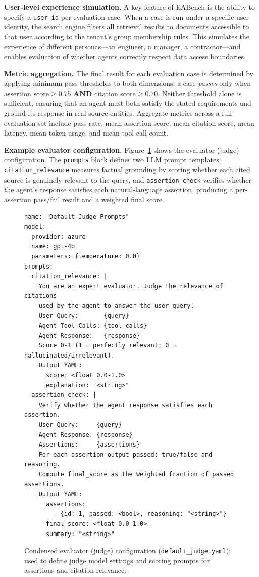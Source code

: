 \documentclass[journal,dvipsnames]{acmart}
\begin{document}
\textbf{User-level experience simulation.}
A key feature of EABench is the ability to specify a \texttt{user\_id} per
evaluation case.  When a case is run under a specific user identity, the search
engine filters all retrieval results to documents accessible to that user
according to the tenant's group membership rules.  This simulates the
experience of different personas---an engineer, a manager, a contractor---and
enables evaluation of whether agents correctly respect data access boundaries.

\textbf{Metric aggregation.}
The final result for each evaluation case is determined by applying minimum
pass thresholds to both dimensions: a case \emph{passes} only when
$\text{assertion\_score} \geq 0.75$ \textbf{AND}
$\text{citation\_score} \geq 0.70$.
Neither threshold alone is sufficient, ensuring that an agent must both satisfy
the stated requirements and ground its response in real source entities.
Aggregate metrics across a full evaluation set include pass rate, mean
assertion score, mean citation score, mean latency, mean token usage, and mean
tool call count.

\textbf{Example evaluator configuration.}
Figure~\ref{lst:judge_config} shows the evaluator (judge) configuration.
The \texttt{prompts} block defines two LLM prompt templates:
\texttt{citation\_relevance} measures factual grounding by scoring whether
each cited source is genuinely relevant to the query, and
\texttt{assertion\_check} verifies whether the agent's response satisfies
each natural-language assertion, producing a per-assertion pass/fail result
and a weighted final score.

\begin{figure}[h]
  \centering
  
\begin{minipage}{0.9\textwidth}
\begin{lstlisting}
name: "Default Judge Prompts"
model:
  provider: azure
  name: gpt-4o
  parameters: {temperature: 0.0}
prompts:
  citation_relevance: |
    You are an expert evaluator. Judge the relevance of citations
    used by the agent to answer the user query.
    User Query:       {query}
    Agent Tool Calls: {tool_calls}
    Agent Response:   {response}
    Score 0-1 (1 = perfectly relevant; 0 = hallucinated/irrelevant).
    Output YAML:
      score: <float 0.0-1.0>
      explanation: "<string>"
  assertion_check: |
    Verify whether the agent response satisfies each assertion.
    User Query:     {query}
    Agent Response: {response}
    Assertions:     {assertions}
    For each assertion output passed: true/false and reasoning.
    Compute final_score as the weighted fraction of passed assertions.
    Output YAML:
      assertions:
        - {id: 1, passed: <bool>, reasoning: "<string>"}
      final_score: <float 0.0-1.0>
      summary: "<string>"
  \end{lstlisting}
\end{minipage}

  \caption{Condensed evaluator (judge) configuration (\texttt{default\_judge.yaml}); used to define judge model settings and scoring prompts for assertions and citation relevance.}
  \label{lst:judge_config}
\end{figure}
\end{document}

